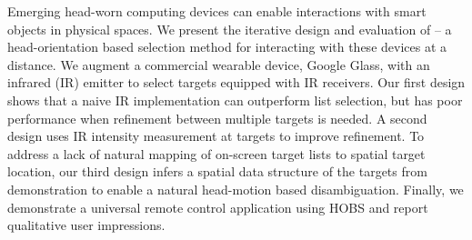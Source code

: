 
Emerging head-worn computing devices can enable interactions with smart objects in physical spaces. 
%
We present the iterative design and evaluation of \systemname -- a head-orientation based selection method for interacting with these devices at a distance. We augment a commercial wearable device, Google Glass, with an infrared (IR) emitter to select targets equipped with IR receivers. Our first design shows that a naive IR implementation can outperform list selection, but has poor performance when refinement between multiple targets is needed. A second design uses IR intensity measurement at targets to improve refinement. To address a lack of natural mapping of on-screen target lists to spatial target location, our third design infers a spatial data structure of the targets from demonstration to enable a natural head-motion based disambiguation.
%
Finally, we demonstrate a universal remote control application using HOBS and report qualitative user impressions.